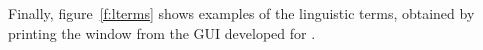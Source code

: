 			Finally, figure~\ref{f:lterms} shows examples of the linguistic terms, obtained by printing the window from the GUI developed for \fl.

		\begin{figure}[ht]
			\centering

\end{figure}
